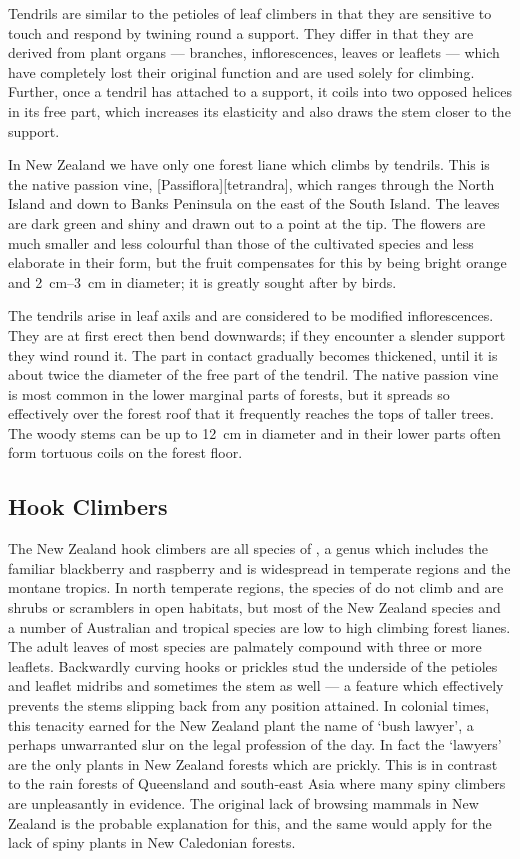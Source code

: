Tendrils are similar to the petioles of leaf climbers in that they are sensitive to touch and respond by twining round a support.
They differ in that they are derived from plant organs --- branches, inflorescences, leaves or leaflets --- which have completely lost their original function and are used solely for climbing.
Further, once a tendril has attached to a support, it coils into two opposed helices in its free part, which increases its elasticity and also draws the stem closer to the support.

In New Zealand we have only one forest liane which climbs by tendrils.
This is the native passion vine, [Passiflora][tetrandra], which ranges through the North Island and down to Banks Peninsula on the east of the South Island.
The leaves are dark green and shiny and drawn out to a point at the tip.
The flowers are much smaller and less colourful than those of the cultivated species and less elaborate in their form, but the fruit compensates for this by being bright orange and \SIrange{2}{3}{\centi\metre} in diameter; it is greatly sought after by birds.

The tendrils arise in leaf axils and are considered to be modified inflorescences.
They are at first erect then bend downwards; if they encounter a slender support they wind round it.
The part in contact gradually becomes thickened, until it is about twice the diameter of the free part of the tendril.
The native passion vine is most common in the lower marginal parts of forests, but it spreads so effectively over the forest roof that it frequently reaches the tops of taller trees.
The woody stems can be up to \SI{12}{\centi\metre} in diameter and in their lower parts often form tortuous coils on the forest floor.

\subsection{Hook Climbers}

The New Zealand hook climbers are all species of , a genus which includes the familiar blackberry and raspberry and is widespread in temperate regions and the montane tropics.
In north temperate regions, the species of  do not climb and are shrubs or scramblers in open habitats, but most of the New Zealand species and a number of Australian and tropical species are low to high climbing forest lianes.
The adult leaves of most species are palmately compound with three or more leaflets.
Backwardly curving hooks or prickles stud the underside of the petioles and leaflet midribs and sometimes the stem as well --- a feature which effectively prevents the stems slipping back from any position attained.
In colonial times, this tenacity earned for the New Zealand plant the name of `bush lawyer', a perhaps unwarranted slur on the legal profession of the day.
In fact the `lawyers' are the only plants in New Zealand forests which are prickly.
This is in contrast to the rain forests of Queensland and south-east Asia where many spiny climbers are unpleasantly in evidence.
The original lack of browsing mammals in New Zealand is the probable explanation for this, and the same would apply for the lack of spiny plants in New Caledonian forests.

